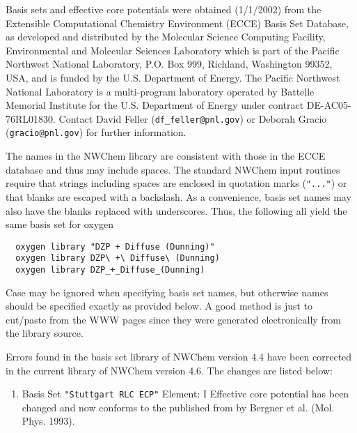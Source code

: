 %
%
\label{sec:knownbasis}

Basis sets and effective core potentials were obtained (1/1/2002) from
the Extensible Computational Chemistry Environment (ECCE) Basis Set
Database, as developed and distributed by the Molecular Science
Computing Facility, Environmental and Molecular Sciences Laboratory
which is part of the Pacific Northwest National Laboratory, P.O. Box
999, Richland, Washington 99352, USA, and is funded by the
U.S. Department of Energy.  The Pacific Northwest National Laboratory
is a multi-program laboratory operated by Battelle Memorial Institute
for the U.S. Department of Energy under contract DE-AC05-76RL01830.
Contact David Feller (\verb+df_feller@pnl.gov+) or Deborah Gracio
(\verb+gracio@pnl.gov+) for further information.

The names in the NWChem library are consistent with those in the ECCE
database and thus may include spaces.  The standard NWChem input
routines require that strings including spaces are enclosed in
quotation marks (\verb+"..."+) or that blanks are escaped with a
backslash.  As a convenience, basis set names may also have the blanks
replaced with underscores.  Thus, the following all yield the same
basis set for oxygen
\begin{verbatim}
  oxygen library "DZP + Diffuse (Dunning)"
  oxygen library DZP\ +\ Diffuse\ (Dunning)
  oxygen library DZP_+_Diffuse_(Dunning)
\end{verbatim}

Case may be ignored when specifying basis set names, but otherwise
names should be specified exactly as provided below.  A good method is
just to cut/paste from the WWW pages since they were generated
electronically from the library source.

Errors found in the basis set library of NWChem version 4.4 have been corrected in
the current library of NWChem version 4.6. The changes are listed below:

\begin{enumerate}

\item Basis Set \verb#"Stuttgart RLC ECP"# \newline
 Element: I \newline
 Effective core potential has been changed and now conforms to the published from by Bergner et al. (Mol. Phys. 1993).

\end{enumerate}


